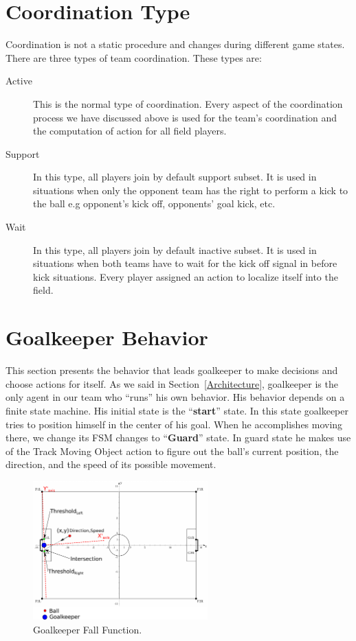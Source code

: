 \section{Coordination Type}

Coordination is not a static procedure and changes during different game states. There are three types of team coordination. These types are:
\begin{description}
\item[Active] This is the normal type of coordination. Every aspect of the coordination process we have discussed above is used for the team's coordination and the computation of action for all field players.
\item[Support] In this type, all players join by default support subset. It is used in situations when only the opponent team has the right to perform a kick to the ball e.g opponent's kick off,  opponents' goal kick, etc.
\item[Wait] In this type, all players join by default inactive subset. It is used in situations when both teams have to wait for the kick off signal in before kick situations. Every player assigned an action to localize itself into the field.
\end{description}



\section{Goalkeeper Behavior}
\label{GoalKeeper}

This section presents the behavior that leads goalkeeper to make decisions and choose actions for itself. As we said in Section~\ref{Architecture}, goalkeeper is the only agent in our team who ``runs'' his own behavior. His behavior depends on a finite state machine. His initial state is the ``\textbf{start}'' state. In this state goalkeeper tries to position himself in the center of his goal. When he accomplishes moving there, we change its FSM changes to ``\textbf{Guard}'' state. In guard state he makes use of the Track Moving Object action to figure out the ball's current position, the direction, and the speed of its possible movement.

\begin{figure}[t!]
\centering
  \includegraphics[trim = 0cm 0cm 10cm 0cm, clip,width=0.6\textwidth]{Chapter3/figures/Goalie.pdf}  
  \caption{Goalkeeper Fall Function.}
  \label{fig:Goalkeeper}
\end{figure} 

